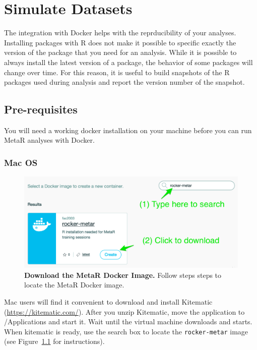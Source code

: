 

\chapter{Simulate Datasets}\label{chap:SimulateDatasets}
The integration with Docker helps with the reprducibility of your analyses. Installing packages with R does not make it possible to specific exactly the version of the package that you need for an analysis. While it is possible to always install the latest version of a package, the behavior of some packages will change over time. For this reason, it is useful to build snapshots of the R packages used during analysis and report the version number of the snapshot. 

\section{Pre-requisites}
You will need a working docker installation on your machine before you can run MetaR analyses with Docker.
\subsection{Mac OS}
\begin{figure}
  \centering
  \includegraphics[width=\figWidthNarrow]{figures/Rocker-MetaR-Image.png}
\caption[Download the MetaR Docker Image.]{\textbf{Download the MetaR Docker Image.} Follow steps steps to locate the MetaR Docker image.}
\label{fig:RockerMetaRImage}
\end{figure}

Mac users will find it convenient to download and install Kitematic (\url{https://kitematic.com/}). 
 After you unzip Kitematic, move the application to /Applications and start it. Wait until the virtual machine downloads and starts. When kitematic is ready, use the search box to locate the \texttt{rocker-metar} image (see Figure~\ref{fig:RockerMetaRImage} for instructions). 



